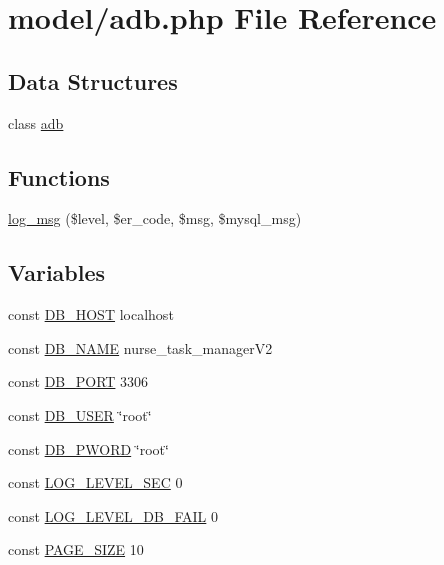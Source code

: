 \hypertarget{adb_8php}{}\section{model/adb.php File Reference}
\label{adb_8php}
\subsection*{Data Structures}
\begin{DoxyCompactItemize}
\item 
class \hyperlink{classadb}{adb}
\end{DoxyCompactItemize}
\subsection*{Functions}
\begin{DoxyCompactItemize}
\item 
\hyperlink{adb_8php_a1e25554d72181a453541a67aacceb663}{log\+\_\+msg} (\$level, \$er\+\_\+code, \$msg, \$mysql\+\_\+msg)
\end{DoxyCompactItemize}
\subsection*{Variables}
\begin{DoxyCompactItemize}
\item 
const \hyperlink{adb_8php_a293363d7988627f671958e2d908c202a}{D\+B\+\_\+\+H\+O\+S\+T} \textquotesingle{}localhost\textquotesingle{}
\item 
const \hyperlink{adb_8php_ab5db0d3504f917f268614c50b02c53e2}{D\+B\+\_\+\+N\+A\+M\+E} \textquotesingle{}nurse\+\_\+task\+\_\+manager\+V2\textquotesingle{}
\item 
const \hyperlink{adb_8php_a5a1723fe7208eb06dad75185af8c3f06}{D\+B\+\_\+\+P\+O\+R\+T} 3306
\item 
const \hyperlink{adb_8php_a1d1d99f8e08f387d84fe9848f3357156}{D\+B\+\_\+\+U\+S\+E\+R} \char`\"{}root\char`\"{}
\item 
const \hyperlink{adb_8php_a83045a6202d81e1bd45c5bf19773579a}{D\+B\+\_\+\+P\+W\+O\+R\+D} \char`\"{}root\char`\"{}
\item 
const \hyperlink{adb_8php_a335d166b8615583931d3ff798c6e2fb1}{L\+O\+G\+\_\+\+L\+E\+V\+E\+L\+\_\+\+S\+E\+C} 0
\item 
const \hyperlink{adb_8php_a44b26ee05d02c7acb05e8b44bbfe4a76}{L\+O\+G\+\_\+\+L\+E\+V\+E\+L\+\_\+\+D\+B\+\_\+\+F\+A\+I\+L} 0
\item 
const \hyperlink{adb_8php_a4634a091c35db33009455321e1d259e3}{P\+A\+G\+E\+\_\+\+S\+I\+Z\+E} 10
\end{DoxyCompactItemize}


